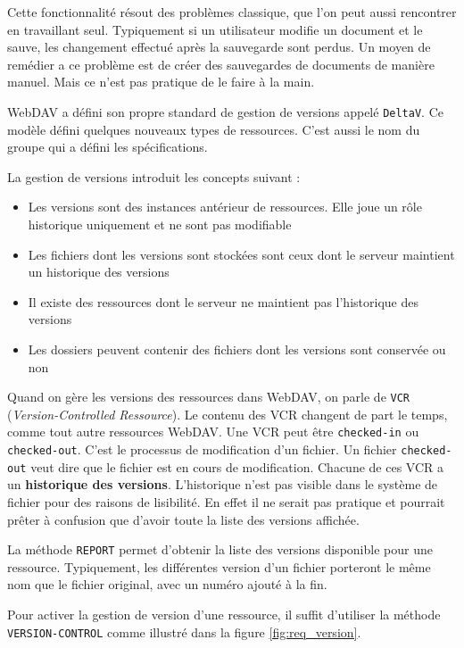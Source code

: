 \documentclass[a4paper, 11pt]{article}
\begin{document}
{		Cette fonctionnalité résout des problèmes classique, que l'on peut aussi rencontrer en travaillant seul. Typiquement si un utilisateur modifie un document et le sauve, les changement effectué après la sauvegarde sont perdus. Un moyen de remédier a ce problème est de créer des sauvegardes de documents de manière manuel. Mais ce n'est pas pratique de le faire à la main. 
		
		WebDAV a défini son propre standard de gestion de versions appelé \texttt{DeltaV}. Ce modèle défini quelques nouveaux types de ressources. C'est aussi le nom du groupe qui a défini les spécifications.
		
		La gestion de versions introduit les concepts suivant : 
		
		\begin{itemize}
			\item Les versions sont des instances antérieur de ressources. Elle joue un rôle historique uniquement et ne sont pas modifiable
			\item Les fichiers dont les versions sont stockées sont ceux dont le serveur maintient un historique des versions
			\item Il existe des ressources dont le serveur ne maintient pas l'historique des versions
			\item Les dossiers peuvent contenir des fichiers dont les versions sont conservée ou non
		\end{itemize}
		
		Quand on gère les versions des ressources dans WebDAV, on parle de \texttt{VCR} (\emph{Version-Controlled Ressource}). Le contenu des VCR changent de part le temps, comme tout autre ressources WebDAV. Une VCR peut être \texttt{checked-in} ou \texttt{checked-out}. C'est le processus de modification d'un fichier. Un fichier \texttt{checked-out} veut dire que le fichier est en cours de modification. Chacune de ces VCR a un \textbf{historique des versions}. L'historique n'est pas visible dans le système de fichier pour des raisons de lisibilité. En effet il ne serait pas pratique et pourrait prêter à confusion que d'avoir toute la liste des versions affichée.
		
		La méthode \texttt{REPORT} permet d'obtenir la liste des versions disponible pour une ressource. Typiquement, les différentes version d'un fichier porteront le même nom que le fichier original, avec un numéro ajouté à la fin. 
		
		Pour activer la gestion de version d'une ressource, il suffit d'utiliser la méthode \texttt{VERSION-CONTROL} comme illustré dans la figure \ref{fig:req_version}.
		
}
\end{document}
